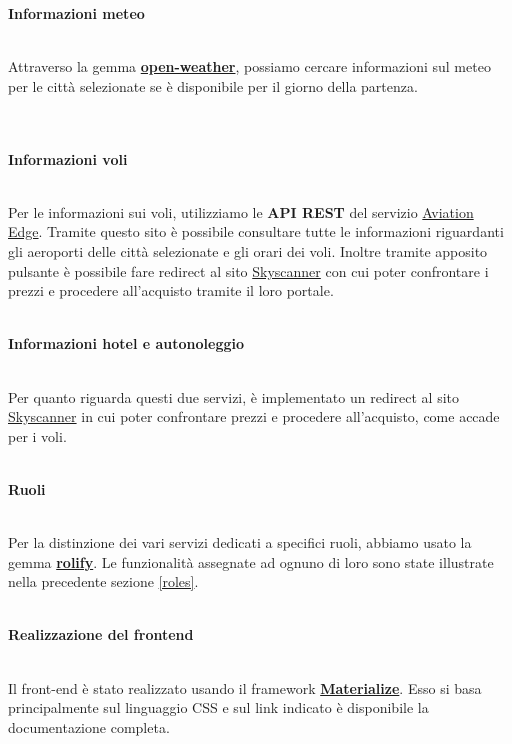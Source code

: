 \documentclass[11pt]{article}
\begin{document}
\begin{large}\textbf{Informazioni meteo}\end{large}\\ 
Attraverso la gemma \href{https://github.com/coderhs/ruby_open_weather_map}{\textbf{open-weather}}, possiamo cercare informazioni sul meteo per le città selezionate se è disponibile per il giorno della partenza.
\\\\\\
\begin{large}\textbf{Informazioni voli}\end{large}\\
Per le informazioni sui voli, utilizziamo le \textbf{API REST} del servizio \href{https://aviation-edge.com/}{Aviation Edge}. Tramite questo sito è possibile consultare tutte le informazioni riguardanti gli aeroporti delle città selezionate e gli orari dei voli. Inoltre tramite apposito pulsante è possibile fare redirect al sito \href{https://www.skyscanner.it}{Skyscanner} con cui poter confrontare i prezzi e procedere all'acquisto tramite il loro portale.
\\\\
\begin{large}\textbf{Informazioni hotel e autonoleggio}\end{large}\\
Per quanto riguarda questi due servizi, è implementato un redirect al sito \href{https://www.skyscanner.it}{Skyscanner} in cui poter confrontare prezzi e procedere all'acquisto, come accade per i voli.
\\\\
\begin{large}\textbf{Ruoli}\end{large}\\
Per la distinzione dei vari servizi dedicati a specifici ruoli, abbiamo usato la gemma \href{https://github.com/RolifyCommunity/rolify}{\textbf{rolify}}. Le funzionalità assegnate ad ognuno di loro sono state illustrate nella precedente sezione \ref{roles}.
\\\\
\begin{large}\textbf{Realizzazione del frontend}\end{large}\\
Il front-end è stato realizzato usando il framework \href{https://github.com/Dogfalo/materialize}{\textbf{Materialize}}. Esso si basa principalmente sul linguaggio CSS e sul link indicato è disponibile la documentazione completa.
\end{document}
